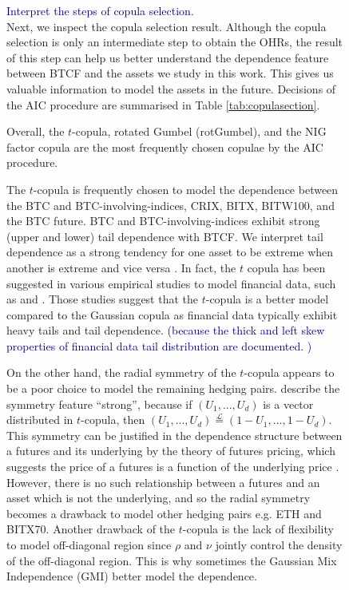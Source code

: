 \begin{figure}[!]
\textcolor{darkblue}{Interpret the steps of copula selection.} \\
Next, we inspect the copula selection result.
Although the copula selection is only an intermediate step to obtain the OHRs,
the result of this step can help us better understand the dependence
feature between BTCF and the assets we study in this work. 
This gives us valuable information to model the assets in the future.
Decisions of the AIC procedure are summarised in Table \ref{tab:copulasection}.

Overall, the $t$-copula, rotated Gumbel (rotGumbel), and the NIG
factor copula are the most frequently chosen copulae by the AIC
procedure. 

The $t$-copula is frequently chosen to model the dependence between
the BTC and BTC-involving-indices, CRIX, BITX, BITW100, and the BTC
future. 
BTC and BTC-involving-indices exhibit strong (upper and lower) tail
dependence with BTCF.  We interpret tail dependence as a strong
tendency for one asset to be extreme when another is extreme and 
vice versa \citep{McNeil2015}. 
In fact, the $t$ copula has been suggested in various empirical
studies to model financial data, such as \cite{zeevi2002beyond} and
\cite{breymann2003dependence}. 
Those studies suggest that the $t$-copula is a better model compared
to the Gaussian copula as financial data typically exhibit heavy tails
and tail dependence. \textcolor{darkblue}{(because the thick and left
  skew  properties of financial data tail distribution are documented. )}
\medskip 

On the other hand, the radial symmetry of the $t$-copula appears to be
a poor choice to model the remaining hedging pairs.
\cite{demarta2005t} describe the symmetry feature ``strong'', because if
$(U_1, ..., U_d)$ is a vector distributed in $t$-copula, 
then $(U_1, ..., U_d) \overset{\mathcal{L}}= (1-U_1, ...,
1-U_d)$. 
This symmetry can be justified in the dependence structure between a
futures and its underlying by the theory of futures pricing, 
which suggests the price of a futures is a function of the underlying
price \citep{hull2003options}. 
However, there is no such relationship between a futures and an asset
which is not the underlying, and so the radial symmetry becomes a
drawback to model other hedging pairs e.g. ETH and BITX70. 
Another drawback of the $t$-copula is the lack of flexibility to model
off-diagonal region since $\rho$ and $\nu$ jointly control the density
of the off-diagonal region. 
This is why sometimes the Gaussian Mix Independence (GMI) better model
the dependence.  


\end{figure}
